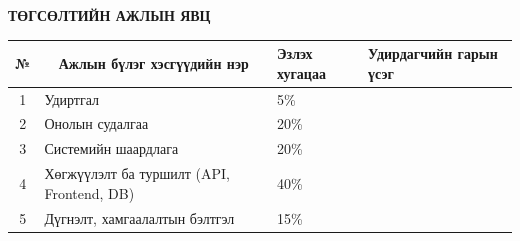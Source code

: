 \begin{titlepage}
  \begin{center}
  \vspace*{2cm}
  \textbf{{\large ТӨГСӨЛТИЙН АЖЛЫН ЯВЦ}}\\[0.5cm]
  
  \small
  \begin{tabular}{|c|p{6cm}|p{2cm}|p{3cm}|}
  \hline
  № & \multicolumn{1}{c|}{Ажлын бүлэг хэсгүүдийн нэр} & Эзлэх хугацаа & Удирдагчийн гарын үсэг \\ \hline
  1 & Удиртгал & 5\% & \\ \hline
  2 & Онолын судалгаа & 20\% & \\ \hline
  3 & Системийн шаардлага & 20\% & \\ \hline
  4 & Хөгжүүлэлт ба туршилт (API, Frontend, DB) & 40\% & \\ \hline
  5 & Дүгнэлт, хамгаалалтын бэлтгэл & 15\% & \\ \hline
  \end{tabular}
  \normalsize
  
  \end{center}

\end{titlepage}